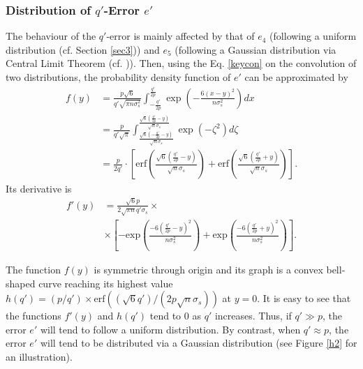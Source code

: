 \documentclass{cta-author}
\begin{document}
\subsubsection{Distribution of $q'$-Error $e'$} 
The behaviour of the $q'$-error is mainly affected by that of $e_4$ (following a uniform distribution (cf. Section \ref{sec3})) and $e_5$ (following a Gaussian distribution via Central Limit Theorem (cf. \cite[Lemma 2]{APS15})). Then, using the Eq.  \eqref{keycon} on the convolution of two distributions, the probability density function of $e'$ can be approximated by
\begin{equation*}\label{keypdf}
\begin{split}
f(y)&=\frac{p\sqrt{6}}{q'\sqrt{\pi n \sigma_s ^2}} \int_{-\frac{q'}{2p}}^{\frac{q'}{2p}}\exp\left(-\frac{6(x-y)^2}{n\sigma_s^2}\right)dx\\
&=\frac{p}{q'\sqrt{\pi}}\int_ {\frac{\sqrt{6} \left(-\frac{q'}{2p}-y \right)}{{\sqrt{n}\sigma_s}}}^ {\frac{\sqrt{6} \left(\frac{q'}{2p}-y \right)}{{\sqrt{n}\sigma_s}}} \exp(-\zeta^2)d\zeta\\
&=\frac{p}{2q'} \cdot \left[\mathrm{erf} \left( \frac{\sqrt{6} \left(\frac{q'}{2p}-y \right)}{\sqrt{n}\sigma_s} \right) +\mathrm{erf} \left( {\frac{\sqrt{6} \left(\frac{q'}{2p}+y \right)}{{\sqrt{n}\sigma_s}}} \right)\right].
\end{split}
\end{equation*}
Its derivative is \begin{equation*}\label{key22}
\begin{split}
f'(y)&=\frac{\sqrt{6}p}{2\sqrt{\pi n} q'\sigma_s} \times \\\
&\times \left[-\text{exp} \left( \frac{-6 \left(\frac{q'}{2p}-y \right)^2}{n\sigma^2_s} \right) +\text{exp} \left( \frac{-6 \left(\frac{q'}{2p}+y \right)^2}{n\sigma^2_s} \right) \right].
\end{split}
\end{equation*}



The function $f(y)$ is symmetric through origin and its graph is a convex bell-shaped curve reaching its highest value $h(q')=({p}/{q'}) \times \mathrm{erf} \left( (\sqrt{6}q')/(2p\sqrt{n}\sigma_s)\right)$ 
at $y=0$.
It is easy to see that the functions $f'(y)$ and $h(q')$ tend to 0 as $q'$ increases. Thus, if $q' \gg p$, the error $e'$ will tend to follow a uniform distribution. By contrast, when $q' \approx p$, the error $e'$ will tend to be distributed via a Gaussian distribution (see Figure \ref{h2} for an illustration). 
\end{document}
